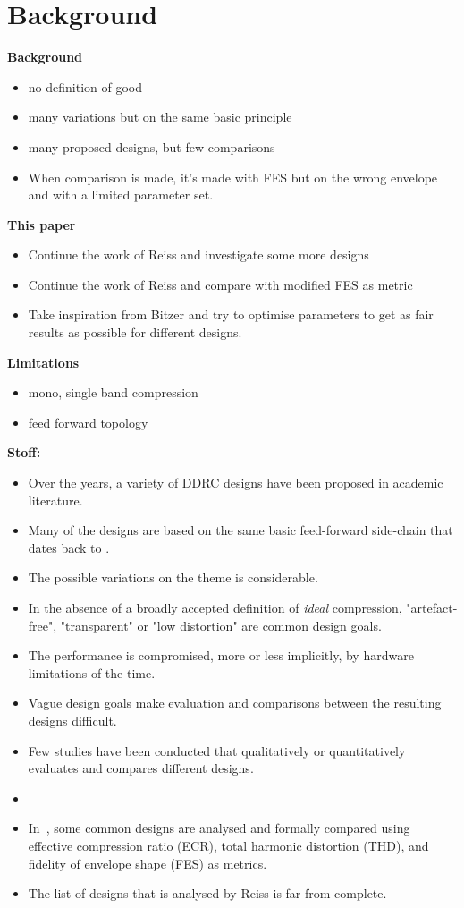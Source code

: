 \documentclass[../main2.tex]{subfiles}
\begin{document}
\FloatBarrier
\section{Background} \label{background}

\textbf{Background}
\begin{itemize}
\item no definition of good
\item many variations but on the same basic principle
\item many proposed designs, but few comparisons
\item When comparison is made, it's made with FES but on the wrong envelope and with a limited parameter set.
\end{itemize}
\textbf{This paper}
\begin{itemize}
\item Continue the work of Reiss and investigate some more designs
\item Continue the work of Reiss and compare with modified FES as metric
\item Take inspiration from Bitzer and try to optimise parameters to get as fair results as possible for different designs.
\end{itemize}
\textbf{Limitations}
\begin{itemize}
\item mono, single band compression
\item feed forward topology
\end{itemize}
\textbf{Stoff:}
\begin{itemize}
\item Over the years, a variety of DDRC designs have been proposed in academic literature. 
\item Many of the designs are based on the same basic feed-forward side-chain that dates back to \cite{mcnally1984dynamic}.
\item The possible variations on the theme is considerable.
\item In the absence of a broadly accepted definition of \emph{ideal} compression, "artefact-free", "transparent" or "low distortion" are common design goals.
\item The performance is compromised, more or less implicitly, by hardware limitations of the time.
\item Vague design goals make evaluation and comparisons between the resulting designs difficult.
\item Few studies have been conducted that qualitatively or quantitatively evaluates and compares different designs. 
\item {}
\item In~\cite{reiss2012tutorial}, some common designs are analysed and formally compared using effective compression ratio (ECR), total harmonic distortion (THD), and fidelity of envelope shape (FES) as metrics. 
\item The list of designs that is analysed by Reiss is far from complete.
\end{itemize}
\end{document}

